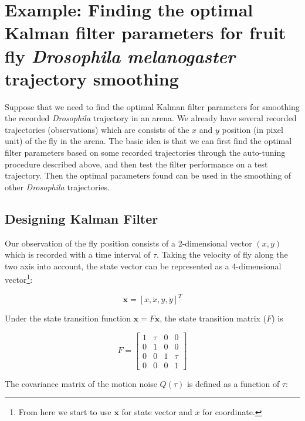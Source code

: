 \section{Example: Finding the optimal Kalman filter parameters for fruit fly \textit{Drosophila melanogaster} trajectory smoothing}

Suppose that we need to find the optimal Kalman filter parameters for smoothing the recorded \textit{Drosophila} 
trajectory in an arena.
We already have several recorded trajectories (observations) which are consists of the $x$ and $y$ position 
(in pixel unit) of the fly in the arena.
The basic idea is that we can first find the optimal filter parameters based on some recorded trajectories 
through the auto-tuning procedure described above, and then test the filter performance on a test trajectory.
Then the optimal parameters found can be used in the smoothing of other \textit{Drosophila} trajectories.

\subsection{Designing Kalman Filter}

Our observation of the fly position consists of a 2-dimensional vector $(x, y)$ which is recorded with a time interval of $\tau$.
Taking the velocity of fly along the two axis into account, the state vector can be represented as a 4-dimensional vector\footnote{From here we start to use $\mathbf{x}$ for state vector and $x$ for coordinate.}:

\begin{equation*}
    \mathbf{x} = [x, \dot{x}, y, \dot{y}]^T
\end{equation*}

Under the state transition function $\mathbf{x} = F\mathbf{x}$, the state transition matrix ($F$) is 

\begin{equation*}
    F = 
    \left[ 
      \begin{array}{cccc}
        1 & \tau & 0 & 0 \\
        0 & 1 & 0 & 0 \\
        0 & 0 & 1 & \tau \\
        0 & 0 & 0 & 1
      \end{array} 
    \right]
\end{equation*}

The covariance matrix of the motion noise $Q(\tau)$ is defined as a function of $\tau$:

